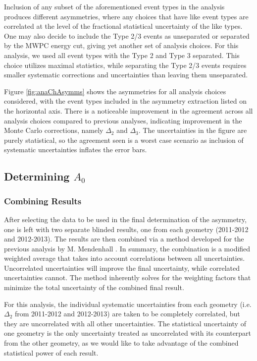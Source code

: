 Inclusion of any subset of the aforementioned event types in the analysis produces different
asymmetries, where any choices that
have like event types are correlated at the level of the fractional statistical uncertainty of the like
types. One may also decide to include the Type 2/3 events as unseparated or separated by the MWPC energy
cut, giving yet another set of analysis choices. For this analysis, we used all event types with the
Type 2 and Type 3 separated. This choice utilizes maximal statistics, while separating the Type 2/3 events
requires smaller systematic corrections and uncertainties than leaving them unseparated.

Figure \ref{fig:anaChAsymms} shows the asymmetries for all analysis choices considered, with the
event types included in the asymmetry extraction listed on the horizontal axis. There is a
noticeable improvement in the agreement across all analysis choices compared to previous analyses,
indicating improvement in the Monte Carlo corrections, namely $\Delta_2$ and $\Delta_3$.
The uncertainties in the figure are
purely statistical, so the agreement seen is a worst case scenario as inclusion of systematic uncertainties
inflates the error bars. 

\subsection{Determining $A_0$}


\subsubsection{Combining Results} \label{sssec:comboResult}

After selecting the data to be used in the final determination of the asymmetry, one is left with
two separate blinded results, one from each geometry (2011-2012 and 2012-2013). The results
are then combined via a method developed for the previous analysis by M. Mendenhall
\cite{mpmThesis}. In summary, the combination is a modified weighted average that takes into
account correlations between all uncertainties. Uncorrelated uncertainties will improve
the final uncertainty, while correlated uncertainties cannot. The method inherently solves for
the weighting factors that minimize the total uncertainty of the combined final result.

For this analysis, the individual systematic uncertainties from each geometry (i.e. $\Delta_2$ from
2011-2012 and 2012-2013)
are taken to be completely correlated, but they are uncorrelated with all other uncertainties.
The statistical uncertainty of one geometry is the only uncertainty treated as
uncorrelated with its counterpart from the other geometry, as we would like to take advantage of
the combined statistical power of each result. 

